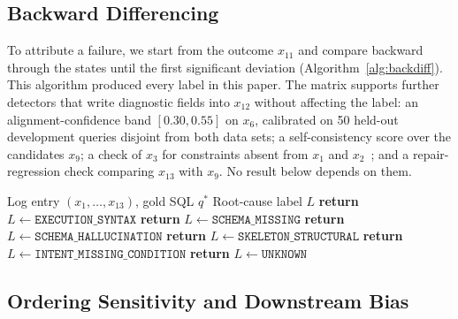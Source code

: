 \documentclass{llncs}
\begin{document}
\subsection{Backward Differencing}

To attribute a failure, we start from the outcome $x_{11}$ and compare
backward through the states until the first significant deviation
(Algorithm~\ref{alg:backdiff}). This algorithm produced every label in this
paper. The matrix supports further detectors that write diagnostic fields into
$x_{12}$ without affecting the label: an alignment-confidence band
$[0.30,0.55]$ on $x_6$, calibrated on 50 held-out development queries disjoint
from both data sets; a self-consistency score over the candidates $x_9$; a
check of $x_3$ for constraints absent from $x_1$ and
$x_2$~\cite{ding_ambisql_2025}; and a repair-regression check comparing
$x_{13}$ with $x_9$. No result below depends on them.

\begin{algorithm}[t]
\caption{Backward differencing for root-cause attribution}
\label{alg:backdiff}
\begin{algorithmic}[1]
\REQUIRE Log entry $(x_1,\ldots,x_{13})$, gold SQL $q^*$
\ENSURE Root-cause label $L$
    \STATE \textbf{return} $L \leftarrow \texttt{EXECUTION\_SYNTAX}$
\ENDIF
{}
        \STATE \textbf{return} $L \leftarrow \texttt{SCHEMA\_MISSING}$
    \ENDIF
        \STATE \textbf{return} $L \leftarrow \texttt{SCHEMA\_HALLUCINATION}$
    \ENDIF
        \STATE \textbf{return} $L \leftarrow \texttt{SKELETON\_STRUCTURAL}$
    \ENDIF
        \STATE \textbf{return} $L \leftarrow \texttt{INTENT\_MISSING\_CONDITION}$
    \ENDIF
\ENDIF
\STATE \textbf{return} $L \leftarrow \texttt{UNKNOWN}$
\end{algorithmic}
\end{algorithm}

\subsection{Ordering Sensitivity and Downstream Bias}
\label{sec:bias_design}
\end{document}
